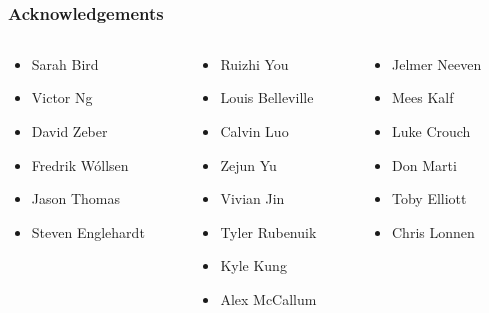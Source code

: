 \documentclass[aspectratio=169]{beamer}
\renewcommand{\LARGE}{\fontsize{31pt}{42pt}\selectfont}
\begin{document}
{
%
\begin{frame}
\vfill
\LARGE{https://github.com/mozilla/}\\
\LARGE{overscripted/}
\end{frame}
}

\begin{frame}
\frametitle{Acknowledgements}
\begin{center}
\begin{columns}[T]
  \begin{column}{.3\linewidth}
  \begin{itemize}
	\item{Sarah Bird}
	\item{Victor Ng}
	\item{David Zeber}
	\item{Fredrik W\'ollsen}
	\item{Jason Thomas}
	\item{Steven Englehardt}
  \end{itemize}
  \end{column}
\begin{column}{.3\linewidth}
  \begin{itemize}
         \item{Ruizhi You}
	\item{Louis Belleville}
	\item{Calvin Luo}
	\item{Zejun Yu}
	\item{Vivian Jin}
	\item{Tyler Rubenuik}
	\item{Kyle Kung}
	\item{Alex McCallum}
	\end{itemize}
  \end{column}
  \begin{column}{.3\linewidth}
  \begin{itemize}
        \item{Jelmer Neeven}
	\item{Mees Kalf}
	\item{Luke Crouch}
	\item{Don Marti}
	\item{Toby Elliott}  
	\item{Chris Lonnen}
	\end{itemize}
  \end{column}
\end{columns}
\end{center}
\end{frame}

\begin{frame}
\begin{center}\LARGE{https://github.com/mlopatka}\end{center}
\end{frame}
\end{document}
